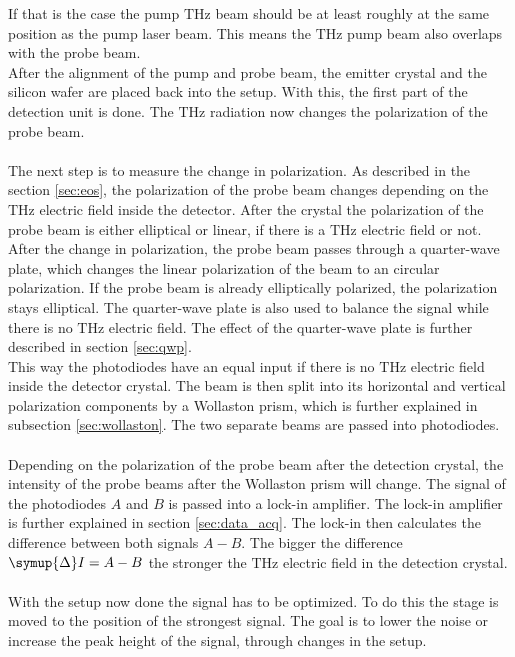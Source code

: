 If that is the case the pump $\si{\tera\hertz}$ beam should be at least roughly at the same position as the pump laser beam.
This means the $\si{\tera\hertz}$ pump beam also overlaps with the probe beam.
\\
After the alignment of the pump and probe beam, the emitter crystal and the silicon wafer are placed back into the setup.
With this, the first part of the detection unit is done.
The $\si{\tera\hertz}$ radiation now changes the polarization of the probe beam.
\\\\
The next step is to measure the change in polarization.
As described in the section \ref{sec:eos}, the polarization of the probe beam changes depending on the $\si{\tera\hertz}$ electric field inside the detector.
After the crystal the polarization of the probe beam is either elliptical or linear, if there is a $\si{\tera\hertz}$ electric field or not.
After the change in polarization, the probe beam passes through a quarter-wave plate, which changes the linear polarization of the beam to an circular polarization.
If the probe beam is already elliptically polarized, the polarization stays elliptical. 
The quarter-wave plate is also used to balance the signal while there is no $\si{\tera\hertz}$ electric field.
The effect of the quarter-wave plate is further described in section \ref{sec:qwp}.
\\
This way the photodiodes have an equal input if there is no $\si{\tera\hertz}$ electric field inside the detector crystal.
The beam is then split into its horizontal and vertical polarization components by a Wollaston prism, which is further explained in subsection \ref{sec:wollaston}.
The two separate beams are passed into photodiodes.
\\\\
Depending on the polarization of the probe beam after the detection crystal, the intensity of the probe beams after the Wollaston prism will change.
The signal of the photodiodes $A$ and $B$ is passed into a lock-in amplifier.
The lock-in amplifier is further explained in section \ref{sec:data_acq}.
The lock-in then calculates the difference between both signals $A-B$.
The bigger the difference $\symup{\Delta}I = A-B$ the stronger the $\si{\tera\hertz}$ electric field in the detection crystal.
\\\\
With the setup now done the signal has to be optimized.
To do this the stage is moved to the position of the strongest signal.
The goal is to lower the noise or increase the peak height of the signal, through changes in the setup.
